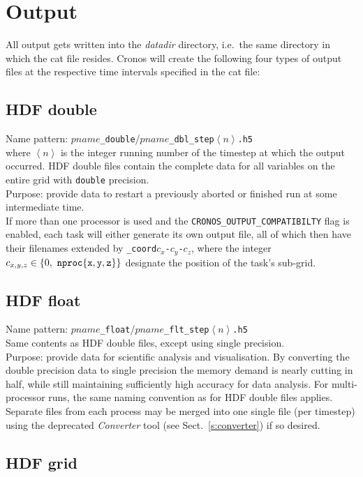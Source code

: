 \section{Output}
All output gets written into the {\it datadir} directory, i.e.\ the
same directory in which the cat file resides. {\sc Cronos} will create the
following four types of output files at the respective time intervals
specified in the cat file:

\subsection{HDF double}
\label{sec:out_double}
Name pattern:
$pname${\tt\_double}/$pname${\tt\_dbl\_step$\left<n\right>$.h5} \\
where $\left<n\right>$ is the integer running number of the timestep
at which the output occurred. HDF double files contain the complete
data for all variables on the entire grid with {\tt double} precision.\\
Purpose: provide data to restart a previously aborted or finished
run at some intermediate time.\\
If more than one processor is used and the \verb+CRONOS_OUTPUT_COMPATIBILTY+
flag is enabled, each task will either generate its own output
file, all of which then have their filenames extended by
\verb+_coord+$c_x${\tt-}$c_y${\tt-}$c_z$, where
the integer \mbox{$c_{x,y,z} \in \{0,\ {\tt nproc\{x,y,z\}} \}$} designate the
position of the task's sub-grid.

\subsection{HDF float}
\label{sec:out_float}
Name pattern:
$pname${\tt\_float}/$pname${\tt\_flt\_step$\left<n\right>$.h5} \\ Same
contents as HDF double files, except using single
precision.\\ Purpose: provide data for scientific analysis and
visualisation. By converting the double precision data to single
precision the memory demand is nearly cutting in half, while still
maintaining sufficiently high accuracy for data analysis. For
multi-processor runs, the same naming convention as for HDF double
files applies. Separate files from each process may be merged into one
single file (per timestep) using the deprecated {\em Converter} tool
(see Sect.~\ref{s:converter}) if so desired.

\subsection{HDF grid}
\label{sec:out_grid}

